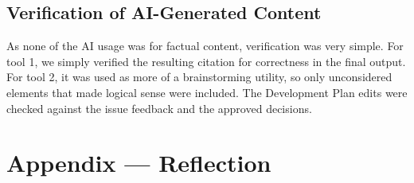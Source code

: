 \documentclass{article}
\begin{document}
\subsection{Verification of AI-Generated Content}

As none of the AI usage was for factual content, verification was very simple. For tool 1, we simply verified the resulting citation for correctness in the final output. For tool 2, it was used as more of a brainstorming utility, so only unconsidered elements that made logical sense were included.
The Development Plan edits were checked against the issue feedback and the approved decisions.

\newpage{}

\section*{Appendix --- Reflection}


\end{document}
